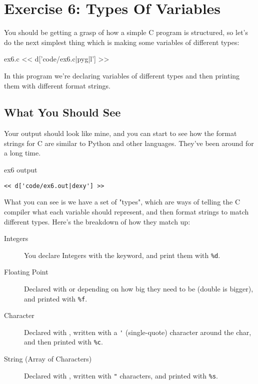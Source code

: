 \chapter{Exercise 6: Types Of Variables}

You should be getting a grasp of how a simple C program is structured,
so let's do the next simplest thing which is making some variables 
of different types:

\begin{code}{ex6.c}
<< d['code/ex6.c|pyg|l'] >>
\end{code}

In this program we're declaring variables of different types 
and then printing them with different  format
strings.

\section{What You Should See}

Your output should look like mine, and you can start to see how
the format strings for C are similar to Python and other languages.
They've been around for a long time.

\begin{code}{ex6 output}
\begin{lstlisting}
<< d['code/ex6.out|dexy'] >>
\end{lstlisting}
\end{code}

What you can see is we have a set of "types", which are ways of
telling the C compiler what each variable should represent, and then
format strings to match different types.  Here's the breakdown
of how they match up:

\begin{description}
\item[Integers] You declare Integers with the  keyword, and 
    print them with \verb|%d|.
\item[Floating Point] Declared with  or  depending
    on how big they need to be (double is bigger), and printed with 
    \verb|%f|.
\item[Character] Declared with , written with a \verb|'| (single-quote)
    character around the char, and then printed with \verb|%c|.
\item[String (Array of Characters)] Declared with , 
    written with \verb|"| characters, and printed with \verb|%s|.
\end{description}


